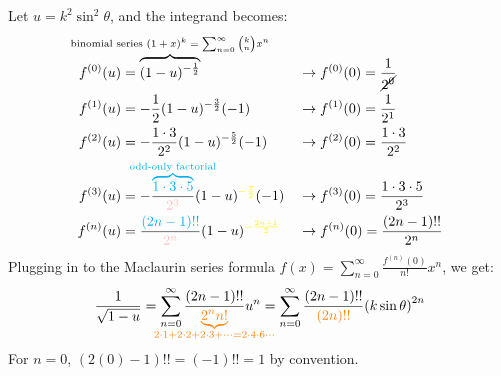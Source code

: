 \documentclass[preview]{standalone}
\begin{document}
\color{white}

Let $u = k^2 \sin^2 \theta$, and the integrand becomes:
\begin{align*}
    f^{(0)}(u) &= \overbrace{(1-u)^{-\frac{1}{2}}}^{\mathclap{\text{binomial series $(1+x)^k =
\sum_{n=0}^{\infty} \binom{k}{n} x^n$}}} &&\rightarrow f^{(0)}(0) =
    \frac{1}{\cancel{2^0}} \\
    f^{(1)}(u) &= -\frac{1}{2} (1-u)^{-\frac{3}{2}} (-1) &&\rightarrow
    f^{(1)}(0) = \frac{1}{2^1} \\
    f^{(2)}(u) &= -\frac{1\cdot3}{2^2} (1-u)^{-\frac{5}{2}} (-1)
    &&\rightarrow f^{(2)}(0) = \frac{1\cdot3}{2^2} \\
    f^{(3)}(u) &= -\frac{\color{cyan}\overbrace{1\cdot3\cdot5}^{\mathclap{\text{odd-only
    factorial}}}}{\color{pink}2^3} (1-u)^{\color{yellow} -\frac{7}{2}} (-1)
    &&\rightarrow f^{(3)}(0) =
    \frac{1\cdot3\cdot5}{2^3} \\
    f^{(n)}(u) &= \frac{{\color{cyan}(2n-1)!!}}{{\color{pink}2^n}} (1-u)^{\color{yellow} -\frac{2n+1}{2}}
    &&\rightarrow f^{(n)}(0) = \frac{{(2n-1)!!}}{{2^n}}
  \end{align*}
Plugging in to the Maclaurin series formula $f(x) =
\sum_{n=0}^{\infty} \frac{f^{(n)}(0)}{n!} x^n$, we get:
\[
  \frac{1}{\sqrt{1 - u}} = \sum_{n=0}^{\infty} \frac{
  (2n-1)!!}{\color{orange}\underbrace{2^n n!}_{\mathclap{2 \cdot 1 + 2 \cdot 2 + 2 \cdot 3 + \cdots = 2 \cdot 4 \cdot 6 \cdots}}} u^n = \sum_{n=0}^{\infty} \frac{ (2n-1)!!}{\color{orange} (2n)!!}
  {\left(k\sin\theta\right)}^{2n}
\]
For $n = 0$, $(2(0) - 1)!! = (-1)!! = 1$ by
convention.
\end{document}
